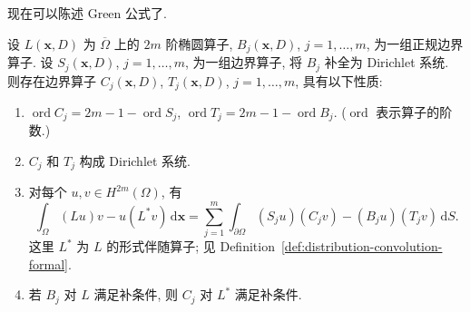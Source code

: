 现在可以陈述 Green 公式了.

\begin{Theorem}
\label{thm:elliptic-green-formula-adjoint-boundary-operators}
设 $L(\bm{x},D)$ 为 $\overline\Omega$ 上的 $2m$ 阶椭圆算子, $B_j(\bm{x},D)$, $j=1,\ldots,m$, 为一组正规边界算子. 设 $S_j(\bm{x},D)$, $j=1,\ldots,m$, 为一组边界算子, 将 $B_j$ 补全为 Dirichlet 系统. 则存在边界算子 $C_j(\bm{x},D)$, $T_j(\bm{x},D)$, $j=1,\ldots,m$, 具有以下性质:\begin{enumerate}\item $\operatorname{ord}C_j=2m-1-\operatorname{ord}S_j$, $\operatorname{ord}T_j=2m-1-\operatorname{ord}B_j$. ($\operatorname{ord}$ 表示算子的阶数.)\item $C_j$ 和 $T_j$ 构成 Dirichlet 系统.\item 对每个 $u,v\in H^{2m}(\Omega)$, 有
\begin{equation}\label{eq:elliptic-green-formula-adjoint-boundary-pairing}
\int_\Omega(Lu)v-u(L^*v)\,\mathrm{d}\bm{x}=\sum_{j=1}^m\int_{\partial\Omega}(S_ju)(C_jv)-(B_ju)(T_jv)\,\mathrm{d}S.
\end{equation}
这里 $L^*$ 为 $L$ 的形式伴随算子; 见 Definition~\ref{def:distribution-convolution-formal}.\item 若 $B_j$ 对 $L$ 满足补条件, 则 $C_j$ 对 $L^*$ 满足补条件.\end{enumerate}
\end{Theorem}

